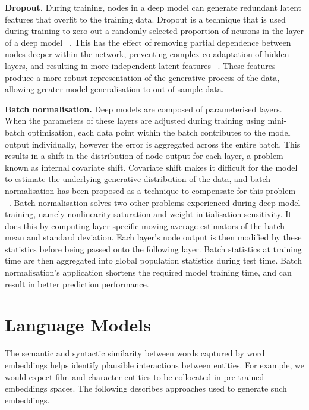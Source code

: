 \noindent \textbf{Dropout.} During training, nodes in a deep model can generate redundant latent features that overfit to the training data. Dropout is a technique that is used during training to zero out a randomly selected proportion of neurons in the layer of a deep model \unskip ~\citep{srivastava2014dropout}. This has the effect of removing partial dependence between nodes deeper within the network, preventing complex co-adaptation of hidden layers, and resulting in more independent latent features \unskip ~\citep{hinton2012improving}. These features produce a more robust representation of the generative process of the data, allowing greater model generalisation to out-of-sample data. \par

\noindent \textbf{Batch normalisation.} Deep models are composed of parameterised layers. When the parameters of these layers are adjusted during training using mini-batch optimisation, each data point within the batch contributes to the model output individually, however the error is aggregated across the entire batch. This results in a shift in the distribution of node output for each layer, a problem known as internal covariate shift. Covariate shift makes it difficult for the model to estimate the underlying generative distribution of the data, and batch normalisation has been proposed as a technique to compensate for this problem \unskip ~\citep{ioffe2015batch}. \newline
Batch normalisation solves two other problems experienced during deep model training, namely nonlinearity saturation and weight initialisation sensitivity. It does this by computing layer-specific moving average estimators of the batch mean and standard deviation. Each layer's node output is then modified by these statistics before being passed onto the following layer. Batch statistics at training time are then aggregated into global population statistics during test time. Batch normalisation's application shortens the required model training time, and can result in better prediction performance. 



\section{Language Models}

\noindent The semantic and syntactic similarity between words captured by word embeddings helps identify plausible interactions between entities. For example, we would expect film and character entities to be collocated in pre-trained embeddings spaces. The following describes approaches used to generate such embeddings. \par

